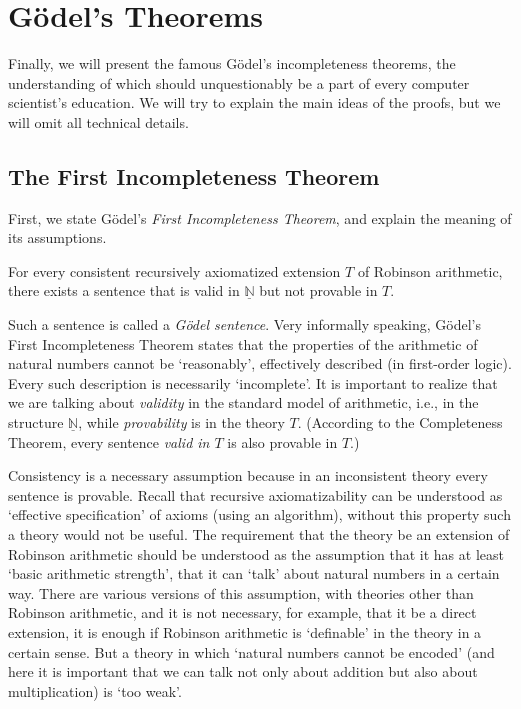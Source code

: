     \section{Gödel's Theorems}
    
    Finally, we will present the famous Gödel's incompleteness theorems, the understanding of which should unquestionably be a part of every computer scientist's education. We will try to explain the main ideas of the proofs, but we will omit all technical details.
    
    \subsection{The First Incompleteness Theorem}
    
    First, we state Gödel's \emph{First Incompleteness Theorem}, and explain the meaning of its assumptions.
    
    \begin{theorem}
    For every consistent recursively axiomatized extension $T$ of Robinson arithmetic, there exists a sentence that is valid in $\underline{\mathbb N}$ but not provable in $T$.    
    \end{theorem}
    
    Such a sentence is called a \emph{Gödel sentence}. Very informally speaking, Gödel's First Incompleteness Theorem states that the properties of the arithmetic of natural numbers cannot be `reasonably', effectively described (in first-order logic). Every such description is necessarily `incomplete'. It is important to realize that we are talking about \emph{validity} in the standard model of arithmetic, i.e., in the structure $\underline{\mathbb N}$, while \emph{provability} is in the theory $T$. (According to the Completeness Theorem, every sentence \emph{valid in $T$} is also provable in $T$.)
    
    Consistency is a necessary assumption because in an inconsistent theory every sentence is provable. Recall that recursive axiomatizability can be understood as `effective specification' of axioms (using an algorithm), without this property such a theory would not be useful. The requirement that the theory be an extension of Robinson arithmetic should be understood as the assumption that it has at least `basic arithmetic strength', that it can `talk' about natural numbers in a certain way. There are various versions of this assumption, with theories other than Robinson arithmetic, and it is not necessary, for example, that it be a direct extension, it is enough if Robinson arithmetic is `definable' in the theory in a certain sense. But a theory in which `natural numbers cannot be encoded' (and here it is important that we can talk not only about addition but also about multiplication) is `too weak'.
    

